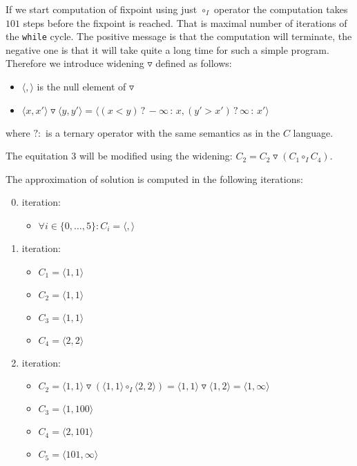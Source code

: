 \documentclass[a4paper, 12pt]{article}
\newcommand{\interval}[2]{\langle #1,#2 \rangle}
\newcommand{\ajoin}[0]{\circ}
\newcommand{\wid}[0]{\triangledown}
\newcommand{\iintg}[0]{I}
\newcommand{\ijoin}[0]{\ajoin_\iintg}
\begin{document}
If we start computation of fixpoint using just $\ijoin$ operator the computation takes $101$ steps
before the fixpoint is reached.
That is maximal number of iterations of the \texttt{while} cycle.
The positive message is that the computation will terminate, the negative one
is that it will take quite a long time for such a simple program.
Therefore we introduce widening $\wid$ defined as follows:
\begin{itemize}
	\item $\interval{}{}$ is the null element of $\wid$
	\item $\interval{x}{x'} \wid \interval{y}{y'} = \interval{(x < y)\,?\,-\infty\,:\,x}{(y' > x')\,?\,\infty\,:\,x'}$
\end{itemize}
where $?:$ is a ternary operator with the same semantics as in the $C$ language.

The equitation $3$ will be modified using the widening:
$C_2 = C_2 \wid (C_1 \ijoin C_4)$.

The approximation of solution is computed in the following iterations:
\begin{enumerate}
	\setcounter{enumi}{-1}
	\item \hspace{-0.5em} iteration:
		\begin{itemize}
			\item $\forall i \in \{0,\ldots,5\}: C_i = \interval{}{}$
		\end{itemize}
	
	\item \hspace{-0.5em} iteration:
		\begin{itemize}
			\item $C_1 = \interval{1}{1}$
			\item $C_2 = \interval{1}{1}$
			\item $C_3 = \interval{1}{1}$
			\item $C_4 = \interval{2}{2}$
		\end{itemize}
	
	\item \hspace{-0.5em} iteration:
		\begin{itemize}
			\item $C_2 = \interval{1}{1} \wid (\interval{1}{1} \ijoin \interval{2}{2})
		               = \interval{1}{1} \wid \interval{1}{2} = \interval{1}{\infty}$
			\item $C_3 = \interval{1}{100}$
			\item $C_4 = \interval{2}{101}$
			\item $C_5 = \interval{101}{\infty}$
		\end{itemize}
\end{enumerate}
\end{document}
